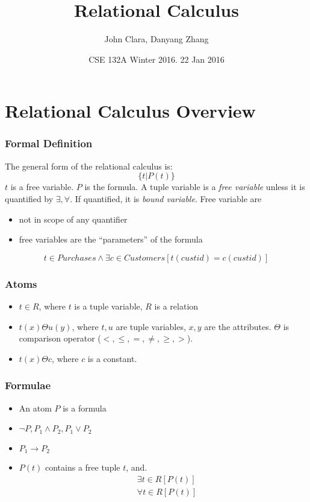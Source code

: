 \documentclass{beamer}
\begin{document}

\title{Relational Calculus}
\author{John Clara, Danyang Zhang}
\date[WI 2016]{CSE 132A Winter 2016. 22 Jan 2016}

\subject{Relational Calculus} %

\begin{frame}
  \titlepage
\end{frame}

\section{Relational Calculus Overview}
\begin{frame}
  \frametitle{Formal Definition}
  The general form of the relational calculus is:
  $$
  \{t | P(t)\}
  $$
  $t$ is a free variable. $P$ is the formula. A tuple variable is a \textit{free
variable} unless it is quantified by $\exists, \forall$. If quantified, it is \textit{bound
variable}. Free variable are 
\begin{itemize}
\item not in scope of any quantifier
\item free variables are the “parameters” of the formula
\end{itemize}
  $$
  t \in Purchases \wedge \exists c \in Customers [t(custid)=c(custid)]
  $$
\end{frame}

\begin{frame}
  \frametitle{Atoms}
  \begin{itemize}
  \item $t \in R$, where $t$ is a tuple variable, $R$ is a relation
  \item $t(x) \Theta u(y)$, where $t, u$ are tuple variables, $x, y$ are the attributes. $\Theta$ is comparison operator ($<, \leq, =, \neq, \geq, >$).
  \item $t(x) \Theta c$, where $c$ is a constant. 
  \end{itemize}
\end{frame}

\begin{frame}
  \frametitle{Formulae}
  \begin{itemize}
  \item An atom $P$ is a formula 
  \item $\neg P, P_1 \wedge P_2, P_1 \vee P_2$
  \item $P_1 \rightarrow P_2$
  \item $P(t)$ contains a free tuple $t$, and.
  \begin{align*}
  &\exists t \in R [P(t)]\\
  &\forall t \in R [P(t)]
  \end{align*}
  \end{itemize}
\end{frame}
\end{document}
